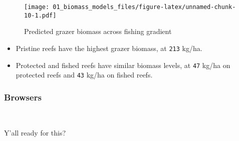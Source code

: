 \documentclass[]{article}
\begin{document}
\begin{figure}
\centering
\texttt{[image: 01\_biomass\_models\_files/figure-latex/unnamed-chunk-10-1.pdf]}
\caption{Predicted grazer biomass across fishing gradient}
\end{figure}

\begin{itemize}
\item
  Pristine reefs have the highest grazer biomass, at \texttt{213} kg/ha.
\item
  Protected and fished reefs have similar biomass levels, at \texttt{47}
  kg/ha on protected reefs and \texttt{43} kg/ha on fished reefs.
\end{itemize}

\newpage

\subsubsection{Browsers}\label{browsers}

~

Y'all ready for this?
\end{document}
